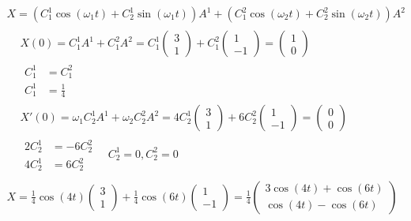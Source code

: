 \documentclass[twoside,10pt]{amsart}
\begin{document}
\[
\begin{gathered}
  X = ( C_1^1 \cos{ (\omega_1 t )} + C_2^1 \sin{ (\omega_1 t )} )A^1 +  ( C_1^2 \cos{ (\omega_2 t )} + C_2^2 \sin{ (\omega_2 t )} )A^2  \\
  \begin{aligned}
    &   X(0) = C_1^1 A^1 + C_1^2A^2 = C_1^1 \left( \begin{matrix} 3 \\ 1 \end{matrix} \right) + C_1^2 \left( \begin{matrix} 1 \\ -1 \end{matrix} \right) = \left( \begin{matrix} 1 \\ 0 \end{matrix} \right)  \\
    & \begin{aligned} C_1^1 & = C_1^2 \\ C_1^1 & = \frac{1}{4} \end{aligned}  \\
    & X'(0) = \omega_1 C_2^1 A^1 + \omega_2 C_2^2 A^2 = 4 C_2^1 \left( \begin{matrix} 3 \\ 1 \end{matrix} \right) + 6 C_2^2 \left( \begin{matrix} 1 \\ -1 \end{matrix} \right) = \left( \begin{matrix} 0 \\ 0 \end{matrix} \right)  \\
    & \begin{aligned} 2 C_2^1 & = -6 C_2^2  \\ 4 C_2^1 & = 6 C_2^2 \end{aligned} \quad C_2^1 = 0, C_2^2 = 0 
  \end{aligned} \\
  X = \frac{1}{4} \cos{ (4t) } \left( \begin{matrix} 3 \\ 1 \end{matrix} \right) + \frac{1}{4} \cos{ (6t)} \left( \begin{matrix} 1 \\ -1 \end{matrix} \right) = \frac{1}{4} \left( \begin{matrix} 3 \cos{ (4t) } + \cos{(6t) } \\ \cos{ (4t) } - \cos{ (6t) } \end{matrix} \right)  
\end{gathered}
\]
\end{document}
